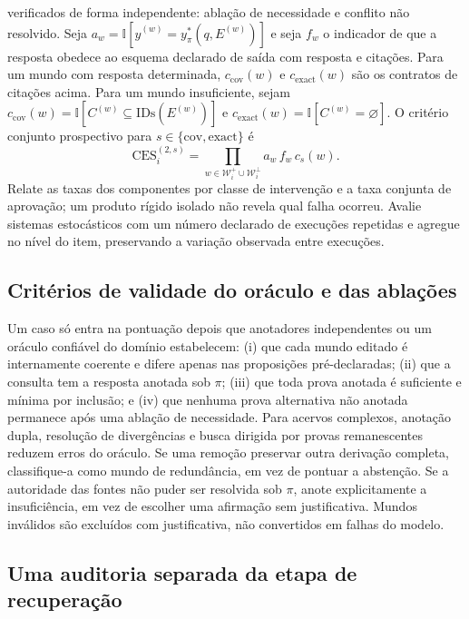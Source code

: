 \documentclass[10pt,twocolumn]{article}
\newcommand{\ind}{\mathbb{I}}
\begin{document}
verificados de forma independente: ablação de necessidade e conflito não
resolvido. Seja $a_w=\ind[\hat y^{(w)}
=y^*_{\pi}(q,E^{(w)})]$ e seja $f_w$ o indicador de que a resposta
obedece ao esquema declarado de saída com resposta e citações. Para um
mundo com resposta determinada, $c_{\mathrm{cov}}(w)$ e
$c_{\mathrm{exact}}(w)$ são os contratos de citações acima. Para um mundo
insuficiente, sejam $c_{\mathrm{cov}}(w)=\ind[C^{(w)}
\subseteq\mathrm{IDs}(E^{(w)})]$ e
$c_{\mathrm{exact}}(w)=\ind[C^{(w)}=\varnothing]$. O critério conjunto
prospectivo para $s\in\{\mathrm{cov},\mathrm{exact}\}$ é
\begin{equation}
\mathrm{CES}^{(2,s)}_i=
\prod_{w\in\mathcal{W}^{+}_i\cup\mathcal{W}^{\bot}_i}
a_w\,f_w\,c_s(w).
\end{equation}
Relate as taxas dos componentes por classe de intervenção e a taxa conjunta
de aprovação; um produto rígido isolado não revela qual falha ocorreu.
Avalie sistemas estocásticos com um número declarado de execuções repetidas
e agregue no nível do item, preservando a variação observada entre execuções.

\subsection{Critérios de validade do oráculo e das ablações}

Um caso só entra na pontuação depois que anotadores independentes ou um
oráculo confiável do domínio estabelecem: (i) que cada mundo editado é
internamente coerente e difere apenas nas proposições pré-declaradas;
(ii) que a consulta tem a resposta anotada sob $\pi$; (iii) que toda prova
anotada é suficiente e mínima por inclusão; e (iv) que nenhuma prova
alternativa não anotada permanece após uma ablação de necessidade. Para
acervos complexos, anotação dupla, resolução de divergências e busca dirigida
por provas remanescentes reduzem erros do oráculo. Se uma remoção preservar
outra derivação completa, classifique-a como mundo de redundância, em vez de
pontuar a abstenção. Se a autoridade das fontes não puder ser resolvida sob
$\pi$, anote explicitamente a insuficiência, em vez de escolher uma
afirmação sem justificativa. Mundos inválidos são excluídos com justificativa,
não convertidos em falhas do modelo.

\subsection{Uma auditoria separada da etapa de recuperação}
\end{document}
